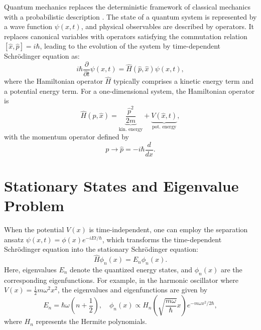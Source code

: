 \documentclass[12pt,a4paper]{report}
\begin{document}
Quantum mechanics replaces the deterministic framework of classical mechanics with a probabilistic description \cite{Griffiths2004Introduction, Sakurai:1341875}. The state of a quantum system is represented by a wave function $\psi(x,t)$, and physical observables are described by operators. It replaces canonical variables with operators satisfying the commutation relation $[\hat{x},\hat{p}] = i\hbar$, leading to the evolution of the system by time-dependent Schrödinger equation  as:
\begin{equation}
    i\hbar\frac{\partial}{\partial t}\psi(x,t) = \hat{H} (\hat{p}, \hat{x}) \psi(x,t),
\end{equation}
where the Hamiltonian operator $\hat{H}$ typically comprises a kinetic energy term and a potential energy term. For a one-dimensional system, the Hamiltonian operator is
\begin{equation}
\hat{H} (\hat{p}, \hat{x}) = \underbrace{\frac{\hat{p}^2}{2m}}_\textrm{kin. energy} + \underbrace{V(\hat{x}, t)}_\textrm{pot. energy},
\end{equation}
with the momentum operator defined by
\begin{equation}
p \rightarrow \hat{p} = -i\hbar\frac{d}{dx}.
\end{equation}

\section{Stationary States and Eigenvalue Problem}
When the potential $V(x)$ is time-independent, one can employ the separation ansatz $\psi(x,t) = \phi(x)e^{-iEt/\hbar}$, which transforms the time-dependent Schrödinger equation into the stationary Schrödinger equation:
\begin{equation}
    \hat{H}\phi_n(x) = E_n\phi_n(x).
\end{equation}
Here, eigenvalues $E_n$ denote the quantized energy states, and $\phi_n(x)$ are the corresponding eigenfunctions. For example, in the harmonic oscillator where $V(x) = \frac{1}{2}m\omega^2x^2$, the eigenvalues and eigenfunctions are given by
\begin{equation}
    E_n = \hbar\omega\left(n + \frac{1}{2}\right), \quad \phi_n(x) \propto H_n\left(\sqrt{\frac{m\omega}{\hbar}}x\right)e^{-m\omega x^2/2\hbar},
\end{equation}
where $H_n$ represents the Hermite polynomials.
\end{document}
